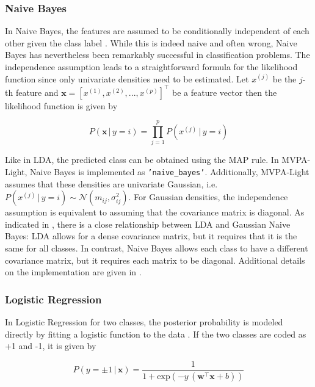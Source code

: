 \documentclass[utf8]{frontiersSCNS} %
\newcommand{\w}{\mathbf{w}}
\newcommand{\x}{\mathbf{x}}
\newcommand{\xf}[1]{x^{(#1)}} %
\begin{document}
\subsubsection{Naive Bayes}

In Naive Bayes, the features are assumed to be conditionally independent of each other given the class label \citep{Bishop2007}. While this is indeed naive and often wrong, Naive Bayes has nevertheless been remarkably successful in classification problems. The independence assumption leads to a straightforward formula for the likelihood function since only univariate densities need to be estimated. Let $\xf{j}$ be the $j$-th feature and $\x = [\xf{1}, \xf{2}, ..., \xf{p}]^\top$ be a feature vector then the likelihood function is given by

\begin{equation*}
P(\x\,|\,y = i) = \prod_{j=1}^p P(\xf{j}\,|\,y = i)
\end{equation*}

Like in LDA, the predicted class can be obtained using the MAP rule. In MVPA-Light, Naive Bayes is implemented as \texttt{'naive\_bayes'}. Additionally, MVPA-Light assumes that these densities are univariate Gaussian, i.e. $P(\xf{j}\,|\,y = i) \sim \mathcal{N}(m_{ij}, \sigma^2_{ij})$. For Gaussian densities, the independence assumption is equivalent to assuming that the covariance matrix is diagonal. As indicated in , there is a close relationship between LDA and Gaussian Naive Bayes: LDA allows for a dense covariance matrix, but it requires that it is the same for all classes. In contrast, Naive Bayes allows each class to have a different covariance matrix, but it requires each matrix to be diagonal. Additional details on the implementation are given in .

\subsubsection{Logistic Regression}

In Logistic Regression for two classes, the posterior probability is modeled directly by fitting a logistic function to the data \citep{Hastie2009}. If the two classes are coded as +1 and -1, it is given by

\begin{equation}
\label{eq:logreg_probability}
P(y = \pm 1\,|\,\x) = \frac{1}{1 + \text{exp}(-y\,(\w^\top\x + b))}
\end{equation}
\end{document}
